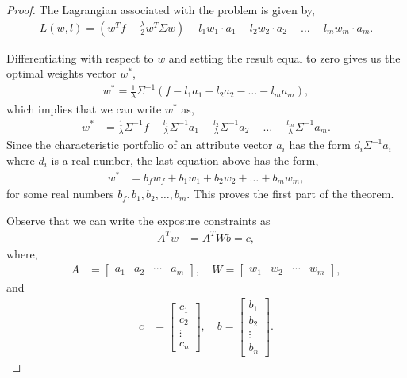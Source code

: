 \documentclass{amsart}
\theoremstyle{plain}
\numberwithin{equation}{section}
\begin{document}
\begin{proof}
The Lagrangian associated with the problem is given by,
\begin{align*}
L(w, l) = \left(w^Tf - \frac{\lambda}{2} w^T \Sigma w\right) - 
l_1 w_1 \cdot a_1 - l_2 w_2 \cdot a_2 - \ldots - l_m w_m \cdot a_m.
\end{align*}

Differentiating with respect to $w$ and setting the result equal to zero gives
us the optimal weights vector $w^*$,
\begin{align*}
w^* = 
\frac{1}{\lambda}\Sigma^{-1}\left(f - l_1 a_1 - 
l_2 a_2 - \ldots - l_m a_m\right),
\end{align*}
which implies that we can write 
$w^*$ as,
\begin{align*}
w^* &= 
\frac{1}{\lambda}\Sigma^{-1}f - \frac{l_1}{\lambda}\Sigma^{-1}a_1 - 
\frac{l_2}{\lambda}\Sigma^{-1} a_2 - \ldots - \frac{l_m}{\lambda}\Sigma^{-1} a_m.
\end{align*}
Since the characteristic portfolio of an attribute vector 
$a_i$ has the form $d_i\Sigma^{-1} a_i$ where $d_i$ is a real number,
the last equation above has the form,
\begin{align*}
w^{*}
&= b_f w_f + b_1 w_1 + b_2 w_2 + \ldots + b_m w_m,
\end{align*}
for some real numbers $b_f, b_1, b_2, \ldots, b_m$.
This proves the first part of the theorem. 


Observe that we can write the exposure 
constraints as
\begin{align*}
A^Tw &= 
A^TWb = c,
\end{align*}
where,
\begin{align*}
A &= 
\begin{bmatrix}
a_1 & a_2 & \cdots & a_m
\end{bmatrix},
\quad
W = 
\begin{bmatrix}
w_1 & w_2 & \cdots & w_m
\end{bmatrix}, 
\end{align*}
and 
\begin{align*}
c &= 
\begin{bmatrix}
c_1 \\
c_2 \\
\vdots\\
 c_n
\end{bmatrix},
\quad
b = 
\begin{bmatrix}
b_1 \\
b_2 \\
\vdots\\
 b_n
\end{bmatrix}.
\end{align*}


\end{proof}
\end{document}
